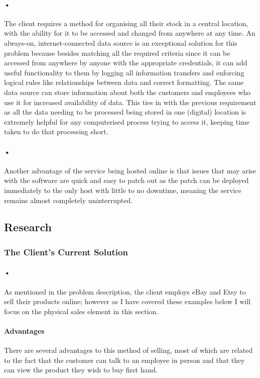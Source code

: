 \documentclass{article}
\begin{document}
    \paragraph{•}
    The client requires a method for organising all their stock in a central location, with the ability for it to be accessed and changed from anywhere at any time. 
    An always-on, internet-connected data source is an exceptional solution for this problem because besides matching all the required criteria since it can be accessed from anywhere by anyone with the appropriate credentials, it can add useful functionality to them by logging all information transfers and enforcing logical rules like relationships between data and correct formatting. 
    The same data source can store information about both the customers and employees who use it for increased availability of data. 
    This ties in with the previous requirement as all the data needing to be processed being stored in one (digital) location is extremely helpful for any computerised process trying to access it, keeping time taken to do that processing short.
    \paragraph{•}
    Another advantage of the service being hosted online is that issues that may arise with the software are quick and easy to patch out as the patch can be deployed immediately to the only host with little to no downtime, meaning the service remains almost completely uninterrupted.
    
    \subsection{Research}
    \subsubsection{The Client's Current Solution}
    \paragraph{•}
    As mentioned in the problem description, the client employs eBay and Etsy to sell their products online; however as I have covered these examples below I will focus on the physical sales element in this section.
    \paragraph{Advantages}
    There are several advantages to this method of selling, most of which are related to the fact that the customer can talk to an employee in person and that they can view the product they wish to buy first hand.
\end{document}
